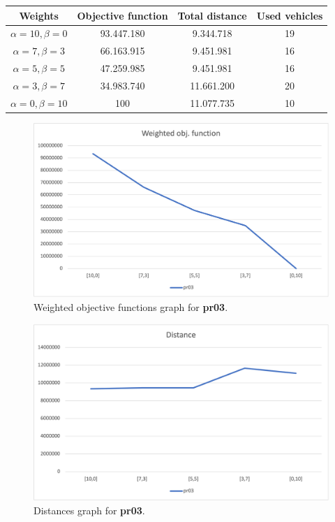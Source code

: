{
\renewcommand{\arraystretch}{2}
\begin{longtable}[h]{| c | c | c | c |}
    \hline
    \textbf{Weights} & \textbf{Objective function} & \textbf{Total distance} & \textbf{Used vehicles} \\
    \hline
    \endhead
    $\alpha = 10, \beta = 0$ & 93.447.180 &  9.344.718 & 19 \\
    \hline
    $\alpha = 7, \beta = 3$  & 66.163.915 &  9.451.981 & 16 \\
    \hline
    $\alpha = 5, \beta = 5$  & 47.259.985 &  9.451.981 & 16 \\
    \hline
    $\alpha = 3, \beta = 7$  & 34.983.740 & 11.661.200 & 20 \\
    \hline
    $\alpha = 0, \beta = 10$ &        100 & 11.077.735 & 10 \\
    \hline
\end{longtable}
}
\begin{figure}[H]
    \centering
    \includegraphics[height=0.25\textheight]{../graphs/pr03-wobjf.png}
    \caption{Weighted objective functions graph for \textbf{pr03}.}
\end{figure}

\begin{figure}[H]
    \centering
    \includegraphics[height=0.25\textheight]{../graphs/pr03-distance.png}
    \caption{Distances graph for \textbf{pr03}.}
\end{figure}

